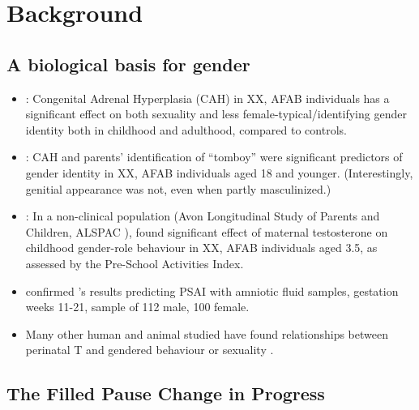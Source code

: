 \documentclass[a0,portrait]{a0poster}
\begin{document}
\begin{multicols}{2}
\begin{enumerate}
\end{enumerate}

\section*{Background}
\subsection*{A biological basis for gender}



\begin{itemize}
	\item \citet{hinesetal2004}: Congenital Adrenal Hyperplasia (CAH) in XX, AFAB individuals has a significant effect on both sexuality and less female-typical/identifying gender identity both in childhood and adulthood, compared to controls.
	\item \citet{berenbaumbailey2003}: CAH and parents' identification of ``tomboy'' were significant predictors of gender identity in XX, AFAB individuals aged 18 and younger. (Interestingly, genitial appearance was not, even when partly masculinized.)
	\item \citet{hinesetal2002}: In a non-clinical population (Avon Longitudinal Study of Parents and Children, ALSPAC \citealt{alspac2001}), found significant effect of maternal testosterone on childhood gender-role behaviour in XX, AFAB individuals aged 3.5, as assessed by the Pre-School Activities Index.
	\item \citet{auyeungetal2009} confirmed \citet{hinesetal2002}'s results predicting PSAI with amniotic fluid samples, gestation weeks 11-21, sample of 112 male, 100 female.
	\item Many other human and animal studied have found relationships between perinatal T and gendered behaviour or sexuality \citep[see][for reviews]{hines2006, balthazart2011}.
\end{itemize}

\subsection*{The Filled Pause Change in Progress}


\end{multicols}
\end{document}
